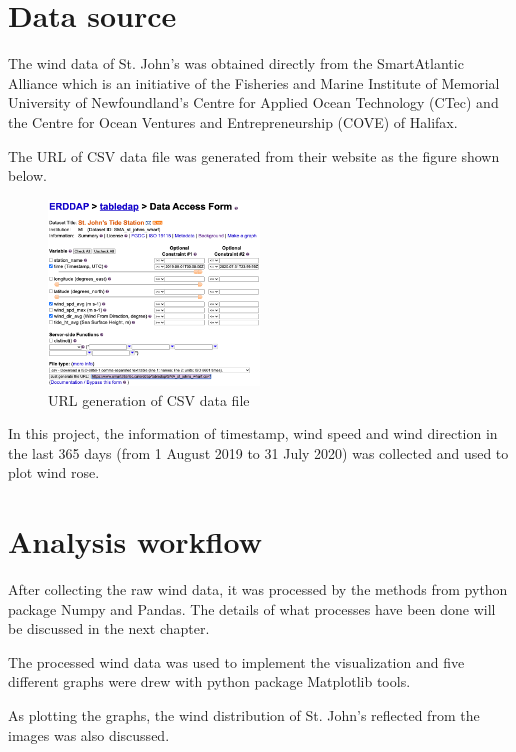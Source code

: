 \documentclass[10pt]{report}
\begin{document}

\section{Data source}
The wind data of St. John's was obtained directly from the SmartAtlantic Alliance which is an initiative of the Fisheries and Marine Institute of Memorial University of Newfoundland's Centre for Applied Ocean Technology (CTec) and the Centre for Ocean Ventures and Entrepreneurship (COVE) of Halifax.\par
The URL of CSV data file was generated from their website as the figure shown below. \par

\begin{figure}[h!]
    \centering
    \includegraphics[width=0.50\textwidth]{images/data_source.png}
    \caption{URL generation of CSV data file}
    \label{fig: PaleBlueDot}    
\end{figure}

In this project, the information of timestamp, wind speed and wind direction in the last 365 days (from 1 August 2019 to 31 July 2020) was collected and used to plot wind rose.\par

\section{Analysis workflow}
After collecting the raw wind data, it was processed by the methods from python package Numpy and Pandas. The details of what processes have been done will be discussed in the next chapter.\par
The processed wind data was used to implement the visualization and five different graphs were drew with python package Matplotlib tools.\par
As plotting the graphs, the wind distribution of St. John's reflected from the images was also discussed.
\end{document}

